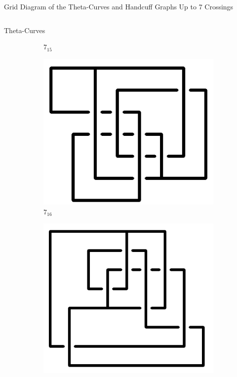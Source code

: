 \documentclass[final]{beamer}
\begin{document}
\begin{frame}[t]
\begin{alertblock}{Grid Diagram of the Theta-Curves and Handcuff Graphs Up to 7 Crossings}
\begin{columns}[t]
\begin{column}{0.5\textwidth}
\begin{alertblock}{Theta-Curves}
\begin{figure}
\begin{subfigure}{0.075\textwidth}
    \caption{$7_{15}$} 
    \end{subfigure}
    \begin{subfigure}{0.075\textwidth}
    \includegraphics[width=\columnwidth]{../Midterm_Poster/grid_diagram/theta_7_16.png}
    \caption{$7_{16}$} 
    \end{subfigure}
    \begin{subfigure}{0.075\textwidth}
    \includegraphics[width=\columnwidth]{../Midterm_Poster/grid_diagram/theta_7_17.png}

\end{subfigure}
\end{figure}
\end{alertblock}
\end{column}
\end{columns}
\end{alertblock}
\end{frame}
\end{document}
